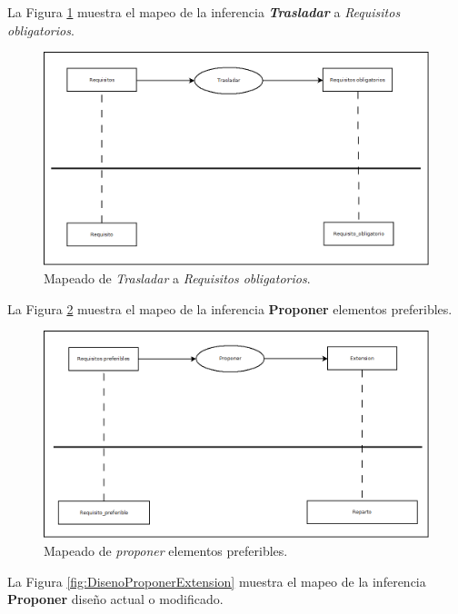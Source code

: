 La Figura \ref{fig:TrasladarObligatorios} muestra el mapeo de la inferencia \textbf{\textit{Trasladar}} a \textit{Requisitos obligatorios}.

\begin{figure}[H]
  \centering
  \includegraphics[scale=0.35]{imaxes/TrasladarObligatorios.png}
  \caption{\label{fig:TrasladarObligatorios}Mapeado de \textit{Trasladar} a \textit{Requisitos obligatorios}.}
\end{figure}

La Figura \ref{fig:PreferiblesProponerExtension} muestra el mapeo de la inferencia \textbf{Proponer} elementos preferibles.

\begin{figure}[H]
  \centering
  \includegraphics[scale=0.35]{imaxes/PreferiblesProponerExtension.png}
  \caption{\label{fig:PreferiblesProponerExtension}Mapeado de \textit{proponer} elementos preferibles.}
\end{figure}

La Figura \ref{fig:DisenoProponerExtension} muestra el mapeo de la inferencia \textbf{Proponer} diseño actual o modificado.

